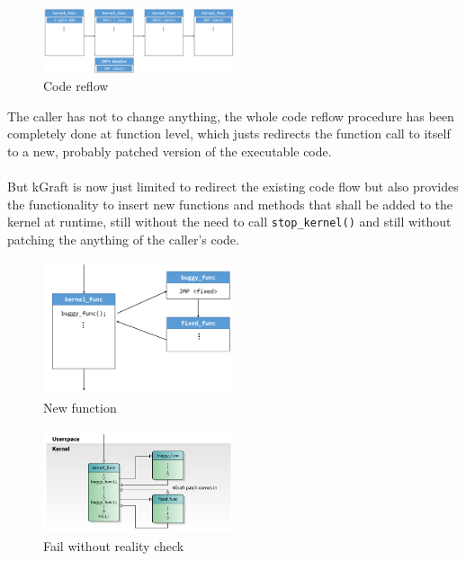 \documentclass{sig-alternate-05-2015}
\begin{document}
\begin{figure}[ht!]
	\includegraphics[width=0.5\textwidth]{img/kgraft_code_reflow.png}
	\caption{Code reflow \cite{kgraft-1}}
	\label{fig:kgraft-code-reflow}
\end{figure}

The caller has not to change anything, the whole code reflow procedure has been completely done at function level, which justs redirects the function call to itself to a new, probably patched version of the executable code. \\ 
\\
But kGraft is now just limited to redirect the existing code flow but also provides the functionality to insert new functions and methods that shall be added to the kernel at runtime, still without the need to call \texttt{stop\_kernel()} and still without patching the anything of the caller's code.

\begin{figure}[ht!]
	\includegraphics[width=0.5\textwidth]{img/kgraft_new_func.png}
	\caption{New function \cite{kgraft-1}}
	\label{fig:kgraft-new-func}
\end{figure}


\begin{figure}[ht!]
	\includegraphics[width=0.5\textwidth]{img/kgraft-live-patching-realty-check-1.png}
	\caption{Fail without reality check \cite{kgraft-2}}
	\label{fig:kgraft-real-check-fail}
\end{figure}
\end{document}
